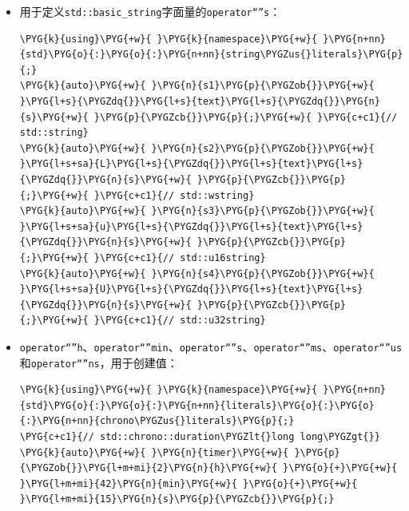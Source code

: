 \begin{itemize}
\item 用于定义\texttt{std::\allowbreak{}basic\_\allowbreak{}string}字面量的\texttt{operator“”s}：



\begin{codeblockbg}
\begin{Verbatim}[commandchars=\\\{\},breaklines=true,breakanywhere=true,fontsize=\codefont,xleftmargin=17bp]
\PYG{k}{using}\PYG{+w}{ }\PYG{k}{namespace}\PYG{+w}{ }\PYG{n+nn}{std}\PYG{o}{:}\PYG{o}{:}\PYG{n+nn}{string\PYGZus{}literals}\PYG{p}{;}
\PYG{k}{auto}\PYG{+w}{ }\PYG{n}{s1}\PYG{p}{\PYGZob{}}\PYG{+w}{  }\PYG{l+s}{\PYGZdq{}}\PYG{l+s}{text}\PYG{l+s}{\PYGZdq{}}\PYG{n}{s}\PYG{+w}{ }\PYG{p}{\PYGZcb{}}\PYG{p}{;}\PYG{+w}{ }\PYG{c+c1}{// std::string}
\PYG{k}{auto}\PYG{+w}{ }\PYG{n}{s2}\PYG{p}{\PYGZob{}}\PYG{+w}{ }\PYG{l+s+sa}{L}\PYG{l+s}{\PYGZdq{}}\PYG{l+s}{text}\PYG{l+s}{\PYGZdq{}}\PYG{n}{s}\PYG{+w}{ }\PYG{p}{\PYGZcb{}}\PYG{p}{;}\PYG{+w}{ }\PYG{c+c1}{// std::wstring}
\PYG{k}{auto}\PYG{+w}{ }\PYG{n}{s3}\PYG{p}{\PYGZob{}}\PYG{+w}{ }\PYG{l+s+sa}{u}\PYG{l+s}{\PYGZdq{}}\PYG{l+s}{text}\PYG{l+s}{\PYGZdq{}}\PYG{n}{s}\PYG{+w}{ }\PYG{p}{\PYGZcb{}}\PYG{p}{;}\PYG{+w}{ }\PYG{c+c1}{// std::u16string}
\PYG{k}{auto}\PYG{+w}{ }\PYG{n}{s4}\PYG{p}{\PYGZob{}}\PYG{+w}{ }\PYG{l+s+sa}{U}\PYG{l+s}{\PYGZdq{}}\PYG{l+s}{text}\PYG{l+s}{\PYGZdq{}}\PYG{n}{s}\PYG{+w}{ }\PYG{p}{\PYGZcb{}}\PYG{p}{;}\PYG{+w}{ }\PYG{c+c1}{// std::u32string}
\end{Verbatim}
\end{codeblockbg}



\item \texttt{operator“”h}、\texttt{operator“”min}、\texttt{operator“”s}、\texttt{operator“”ms}、\texttt{operator“”us}和\texttt{operator“”ns}，用于创建值：



\begin{codeblockbg}
\begin{Verbatim}[commandchars=\\\{\},breaklines=true,breakanywhere=true,fontsize=\codefont,xleftmargin=17bp]
\PYG{k}{using}\PYG{+w}{ }\PYG{k}{namespace}\PYG{+w}{ }\PYG{n+nn}{std}\PYG{o}{:}\PYG{o}{:}\PYG{n+nn}{literals}\PYG{o}{:}\PYG{o}{:}\PYG{n+nn}{chrono\PYGZus{}literals}\PYG{p}{;}
\PYG{c+c1}{// std::chrono::duration\PYGZlt{}long long\PYGZgt{}}
\PYG{k}{auto}\PYG{+w}{ }\PYG{n}{timer}\PYG{+w}{ }\PYG{p}{\PYGZob{}}\PYG{l+m+mi}{2}\PYG{n}{h}\PYG{+w}{ }\PYG{o}{+}\PYG{+w}{ }\PYG{l+m+mi}{42}\PYG{n}{min}\PYG{+w}{ }\PYG{o}{+}\PYG{+w}{ }\PYG{l+m+mi}{15}\PYG{n}{s}\PYG{p}{\PYGZcb{}}\PYG{p}{;}
\end{Verbatim}
\end{codeblockbg}



\end{itemize}
